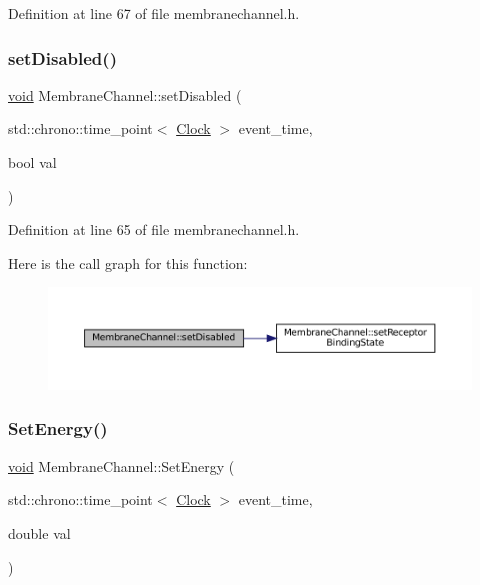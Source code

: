 Definition at line 67 of file membranechannel.\+h.

\mbox{\label{class_membrane_channel_aed2055857888506a35c09bdcc265799a}} 
\subsubsection{\texorpdfstring{set\+Disabled()}{setDisabled()}}
{\footnotesize\ttfamily \mbox{\hyperlink{glad_8h_a950fc91edb4504f62f1c577bf4727c29}{void}} Membrane\+Channel\+::set\+Disabled (\begin{DoxyParamCaption}\item[{std\+::chrono\+::time\+\_\+point$<$ \mbox{\hyperlink{universe_8h_a0ef8d951d1ca5ab3cfaf7ab4c7a6fd80}{Clock}} $>$}]{event\+\_\+time,  }\item[{bool}]{val }\end{DoxyParamCaption})\hspace{0.3cm}{\ttfamily [inline]}}



Definition at line 65 of file membranechannel.\+h.

Here is the call graph for this function\+:\nopagebreak
\begin{figure}[H]
\begin{center}
\leavevmode
\includegraphics[width=350pt]{class_membrane_channel_aed2055857888506a35c09bdcc265799a_cgraph}
\end{center}
\end{figure}
\mbox{\label{class_membrane_channel_aaa2d816d3887b6292d995a83130a4834}} 
\subsubsection{\texorpdfstring{Set\+Energy()}{SetEnergy()}}
{\footnotesize\ttfamily \mbox{\hyperlink{glad_8h_a950fc91edb4504f62f1c577bf4727c29}{void}} Membrane\+Channel\+::\+Set\+Energy (\begin{DoxyParamCaption}\item[{std\+::chrono\+::time\+\_\+point$<$ \mbox{\hyperlink{universe_8h_a0ef8d951d1ca5ab3cfaf7ab4c7a6fd80}{Clock}} $>$}]{event\+\_\+time,  }\item[{double}]{val }\end{DoxyParamCaption})\hspace{0.3cm}{\ttfamily [inline]}}



